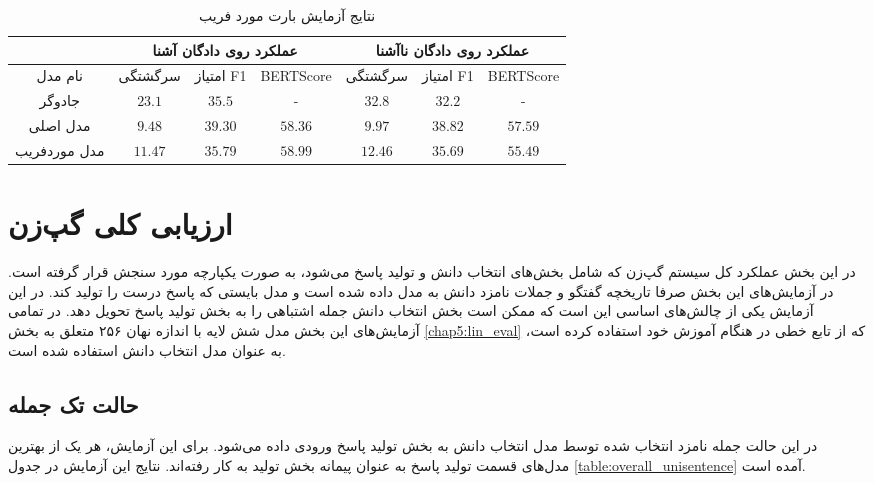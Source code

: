 \begin{table}[h]
	\caption{نتایج آزمایش بارت مورد فریب}
	\label{table:bart_deceive}
	\begin{tabular}{|c|c|c|c|c|c|c|}
		\hline
		& \multicolumn{3}{c|}{عملکرد روی دادگان آشنا} & \multicolumn{3}{c|}{عملکرد روی دادگان نا‌آشنا} \\ \hline
		نام مدل      & سرگشتگی     & امتیاز F1     & BERTScore     & سرگشتگی      & امتیاز F1      & BERTScore      \\ \hline
		جادوگر       & $23.1$      & $35.5$        & -             & $32.8$       & $32.2$         & -              \\ \hline
		مدل اصلی     & $9.48$      & $39.30$       & $58.36$       & $9.97$       & $38.82$        & $57.59$        \\ \hline
		مدل موردفریب & $11.47$     & $35.79$       & $58.99$       & $12.46$      & $35.69$        & $55.49$        \\ \hline
	\end{tabular}
\end{table}


\section{ارزیابی کلی گپ‌زن}
در این بخش عملکرد کل سیستم گپ‌زن که شامل بخش‌های انتخاب دانش و تولید پاسخ می‌شود، به صورت یکپارچه مورد سنجش قرار گرفته است. در آزمایش‌های این بخش صرفا تاریخچه گفتگو و جملات نامزد دانش به مدل داده شده است و مدل بایستی که پاسخ درست را تولید کند. در این آزمایش یکی از چالش‌های اساسی این است که ممکن است بخش انتخاب دانش جمله اشتباهی را به بخش تولید پاسخ تحویل دهد. در تمامی آزمایش‌های این بخش مدل شش لایه با اندازه نهان ۲۵۶ متعلق به بخش 
\ref{chap5:lin_eval}
که از تابع خطی در هنگام آموزش خود استفاده کرده است،‌ به عنوان مدل انتخاب دانش استفاده شده است.

\subsection{حالت تک جمله}
در این حالت جمله نامزد انتخاب شده توسط مدل انتخاب دانش به بخش تولید پاسخ ورودی داده می‌شود. برای این آزمایش، هر یک از بهترین مدل‌های قسمت تولید پاسخ به عنوان پیمانه بخش تولید به کار رفته‌اند. نتایج این آزمایش در جدول 
 \ref{table:overall_unisentence} 
آمده است.

